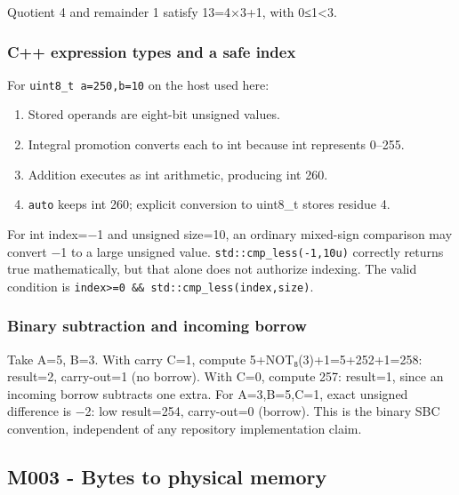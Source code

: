Quotient 4 and remainder 1 satisfy 13=4×3+1, with 0≤1\textless3.

\subsubsection{C++ expression types and a safe index}\label{appendix-92ff77d4dfdc-c-expression-types-and-a-safe-index}

\hypertarget{appendix-92ff77d4dfdc-c-expression-types-and-a-safe-index}{}

For \texttt{uint8\_t\ a=250,b=10} on the host used here:

\begin{enumerate}
\def\labelenumi{\arabic{enumi}.}
\tightlist
\item
  Stored operands are eight-bit unsigned values.
\item
  Integral promotion converts each to int because int represents 0--255.
\item
  Addition executes as int arithmetic, producing int 260.
\item
  \texttt{auto} keeps int 260; explicit conversion to uint8\_t stores residue 4.
\end{enumerate}

For int index=−1 and unsigned size=10, an ordinary mixed-sign comparison may convert −1 to a large unsigned value. \texttt{std::cmp\_less(-1,10u)} correctly returns true mathematically, but that alone does not authorize indexing. The valid condition is \texttt{index\textgreater{}=0\ \&\&\ std::cmp\_less(index,size)}.

\subsubsection{Binary subtraction and incoming borrow}\label{appendix-92ff77d4dfdc-binary-subtraction-and-incoming-borrow}

\hypertarget{appendix-92ff77d4dfdc-binary-subtraction-and-incoming-borrow}{}

Take A=5, B=3. With carry C=1, compute 5+NOT₈(3)+1=5+252+1=258: result=2, carry-out=1 (no borrow). With C=0, compute 257: result=1, since an incoming borrow subtracts one extra. For A=3,B=5,C=1, exact unsigned difference is −2: low result=254, carry-out=0 (borrow). This is the binary SBC convention, independent of any repository implementation claim.

\subsection{M003 - Bytes to physical memory}\label{appendix-92ff77d4dfdc-m003---bytes-to-physical-memory}

